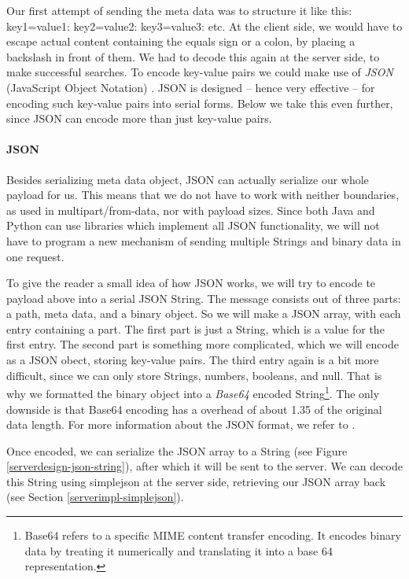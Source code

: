 Our first attempt of sending the meta data was to structure it like this:
key1=value1: key2=value2: key3=value3: etc. At the client side, we would have to
escape actual content containing the equals sign or a colon, by placing a
backslash in front of them. We had to decode this again at the server side, to
make successful searches. To encode key-value pairs we could make use of
\emph{JSON} (JavaScript Object Notation) \cite{json-www}. JSON is designed --
hence very effective -- for encoding such key-value pairs into serial forms.
Below we take this even further, since JSON can encode more than just
key-value pairs.

\paragraph{JSON}
\label{serverdesign-json}
Besides serializing meta data object, JSON can actually serialize our whole
payload for us. This means that we do not have to work with neither boundaries,
as used in multipart/from-data, nor with payload sizes. Since both Java and
Python can use libraries which implement all JSON functionality, we will not
have to program a new mechanism of sending multiple Strings and binary data
in one request. 

To give the reader a small idea of how JSON works, we will try to encode te
payload above into a serial JSON String. The message consists out of three parts:
a path, meta data, and a binary object. So we will make a JSON array, with each
entry containing a part. The first part is just a String, which is a value for
the first entry. The second part is something more complicated, which we will
encode as a JSON obect, storing key-value pairs. The third entry again is a bit
more difficult, since we can only store Strings, numbers, booleans, and null.
That is why we formatted the binary object into a \emph{Base64} encoded
String\footnote{Base64 refers to a specific MIME content transfer encoding. It
encodes binary data by treating it numerically and translating it into a base 64
representation.}. The only downside is that Base64 encoding has a overhead of
about 1.35 of the original data length. For more information about the JSON
format, we refer to \cite{json-www}.

Once encoded, we can serialize the JSON array to a String (see Figure
\ref{serverdesign-json-string}), after which it will be sent to the server. We
can decode this String using simplejson at the server side, retrieving our JSON
array back (see Section \ref{serverimpl-simplejson}).

